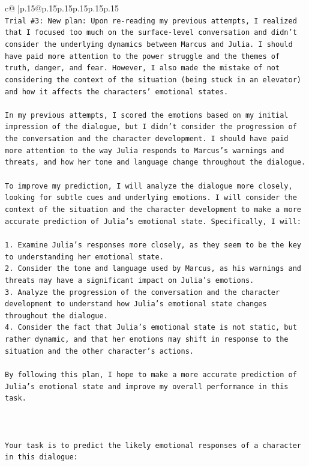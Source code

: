 \documentclass{article}
\begin{document}
{\begin{supertabular}{c@{$\;$}|p{.15\linewidth}@{}p{.15\linewidth}p{.15\linewidth}p{.15\linewidth}p{.15\linewidth}p{.15\linewidth}}
{{{\\ 
\texttt{Trial \#3: New plan: Upon re{-}reading my previous attempts, I realized that I focused too much on the surface{-}level conversation and didn't consider the underlying dynamics between Marcus and Julia. I should have paid more attention to the power struggle and the themes of truth, danger, and fear. However, I also made the mistake of not considering the context of the situation (being stuck in an elevator) and how it affects the characters' emotional states. } \\
\\ 
\texttt{In my previous attempts, I scored the emotions based on my initial impression of the dialogue, but I didn't consider the progression of the conversation and the character development. I should have paid more attention to the way Julia responds to Marcus's warnings and threats, and how her tone and language change throughout the dialogue.} \\
\\ 
\texttt{To improve my prediction, I will analyze the dialogue more closely, looking for subtle cues and underlying emotions. I will consider the context of the situation and the character development to make a more accurate prediction of Julia's emotional state. Specifically, I will:} \\
\\ 
\texttt{1. Examine Julia's responses more closely, as they seem to be the key to understanding her emotional state.} \\
\texttt{2. Consider the tone and language used by Marcus, as his warnings and threats may have a significant impact on Julia's emotions.} \\
\texttt{3. Analyze the progression of the conversation and the character development to understand how Julia's emotional state changes throughout the dialogue.} \\
\texttt{4. Consider the fact that Julia's emotional state is not static, but rather dynamic, and that her emotions may shift in response to the situation and the other character's actions.} \\
\\ 
\texttt{By following this plan, I hope to make a more accurate prediction of Julia's emotional state and improve my overall performance in this task.} \\
\\ 
\\ 
\\ 
\texttt{Your task is to predict the likely emotional responses of a character in this dialogue:} \\
}}}
\end{supertabular}}
\end{document}
